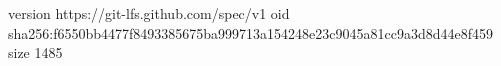version https://git-lfs.github.com/spec/v1
oid sha256:f6550bb4477f8493385675ba999713a154248e23c9045a81cc9a3d8d44e8f459
size 1485
